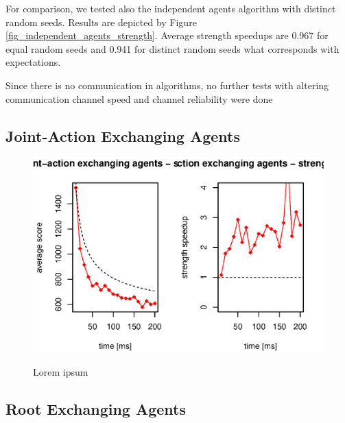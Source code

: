 For comparison, we tested also the independent agents algorithm with distinct random seeds.
Results are depicted by Figure \ref{fig_independent_agents_strength}. Average strength speedups
are 0.967 for equal random seeds and 0.941 for distinct random seeds what corresponds with
expectations.

Since there is no communication in algorithms, no further tests with altering communication
channel speed and channel reliability were done




\subsection{Joint-Action Exchanging Agents}

\begin{figure}
\begin{center}
\includegraphics{img/move-exchange-strength.eps}
\end{center}
\caption{\footnotesize Lorem ipsum}{\footnotesize }
\label{fig_action_exchanging_strength}
\end{figure}


\subsection{Root Exchanging Agents}

